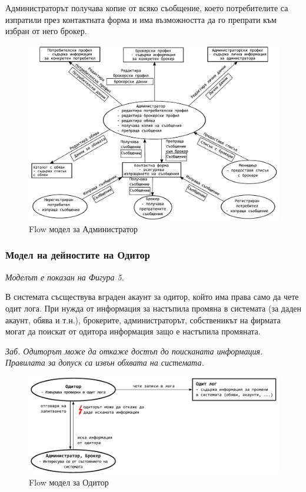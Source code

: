 \documentclass[a4paper]{article}
\begin{document}
Администраторът получава копие от всяко съобщение, което потребителите са изпратили през контактната форма и има възможността да го препрати към избран от него брокер.

	\begin{figure}[h]
	\centering
	\includegraphics[scale=0.85]{flow-administrator}
	\caption{Flow модел за Администратор}
	\end{figure}
	
\subsubsection{Модел на дейностите на Одитор}	

\emph{Моделът е показан на Фигура 5.} 

В системата съсществува вграден акаунт за одитор, който има права само да чете одит лога. При нужда от информация за настъпила промяна в системата (за даден акаунт, обява и т.н.), брокерите, администраторът, собственикът на фирмата могат да поискат от одитора информация защо е настъпила промяната. 
	
\emph{Заб. Одиторът може да откаже достъп до поисканата информация. Правилата за допуск са извън обхвата на системата.}

	\begin{figure}[h]
	\centering
	\includegraphics[scale=0.85]{flow-auditor-small}
	\caption{Flow модел за Одитор}
	\end{figure}
\end{document}
